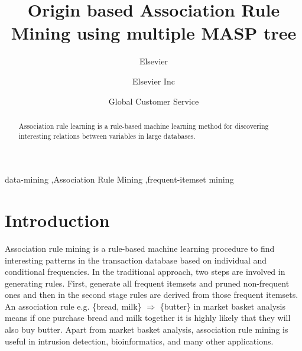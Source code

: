 \documentclass[review]{elsarticle}
\begin{document}
\begin{frontmatter}

\title{Origin based Association Rule Mining using multiple MASP tree}

\author{Elsevier}
\address{Radarweg 29, Amsterdam}

\author[mymainaddress,mysecondaryaddress]{Elsevier Inc}

\author[mysecondaryaddress]{Global Customer Service}

\address[mymainaddress]{1600 John F Kennedy Boulevard, Philadelphia}
\address[mysecondaryaddress]{360 Park Avenue South, New York}

\begin{abstract}
Association rule learning is a rule-based machine learning method for discovering interesting relations between variables in large databases.
\end{abstract}

\begin{keyword}
data-mining \sep Association Rule Mining \sep frequent-itemset mining 
\end{keyword}

\end{frontmatter}

\section{Introduction}
Association rule mining is a rule-based machine learning procedure to find interesting patterns in the transaction database based on individual and conditional frequencies. In the traditional approach, two steps are involved in generating rules. First, generate all frequent itemsets and pruned non-frequent ones and then in the second stage rules are derived from those frequent itemsets. An association rule e.g. \{bread, milk\} $\Rightarrow$ \{butter\} in market basket analysis means if one purchase bread and milk together it is highly likely that they will also buy butter. Apart from market basket analysis, association rule mining is useful in intrusion detection, bioinformatics, and many other applications.
\end{document}
